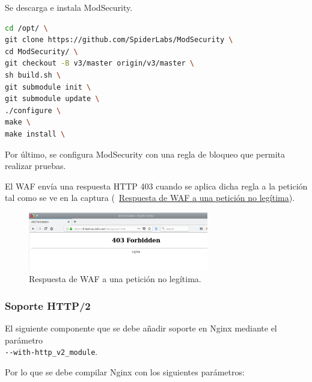 \par Se descarga e instala ModSecurity. \\
\begin{minipage}{\linewidth}
\begin{lstlisting}[language=bash]
cd /opt/ \
git clone https://github.com/SpiderLabs/ModSecurity \
cd ModSecurity/ \
git checkout -B v3/master origin/v3/master \
sh build.sh \
git submodule init \
git submodule update \
./configure \
make \
make install \
\end{lstlisting}
\end{minipage}

\par Por último, se configura ModSecurity con una regla de bloqueo que permita realizar pruebas.\\
\begin{minipage}{\linewidth}
  
\end{minipage}
\par El WAF envía una respuesta HTTP 403 cuando se aplica dicha regla a la petición tal como se ve en la captura ({~\hyperref[fig:WAF_test]{Respuesta de WAF a una petición no legítima}}).

\begin{figure}[!ht]
  \centering
  \label{fig:WAF_test}
  \includegraphics[width=0.7\textwidth]{fig/WAF_testparam}
  \caption{Respuesta de WAF a una petición no legítima. }
\end{figure}

\subsubsection{Soporte HTTP/2}
\par El siguiente componente que se debe añadir soporte en Nginx mediante el parámetro \\ \lstinline{--with-http_v2_module}.

\par Por lo que se debe compilar Nginx con los siguientes parámetros:\\
\begin{minipage}{\linewidth}
  
\end{minipage}

